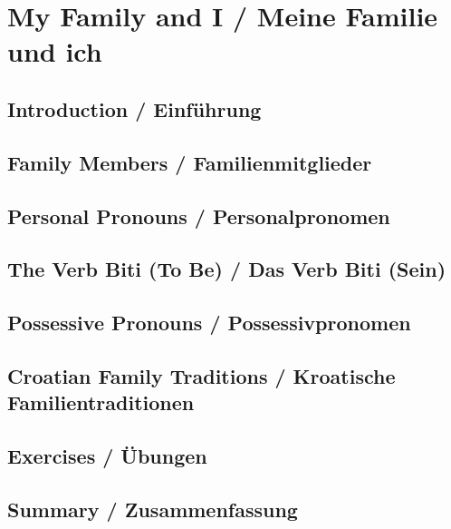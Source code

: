 \chapter{My Family and I / Meine Familie und ich}

\section{Introduction / Einführung}

\section{Family Members / Familienmitglieder}

\section{Personal Pronouns / Personalpronomen}

\section{The Verb \glqq Biti\grqq{} (To Be) / Das Verb \glqq Biti\grqq{} (Sein)}

\section{Possessive Pronouns / Possessivpronomen}

\section{Croatian Family Traditions / Kroatische Familientraditionen}

\section{Exercises / Übungen}

\section{Summary / Zusammenfassung}
